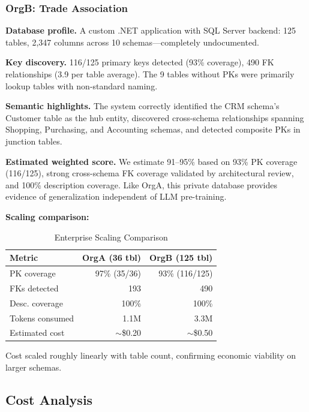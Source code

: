 \documentclass[twocolumn]{svjour3}
\begin{document}
\subsubsection{OrgB: Trade Association}

\textbf{Database profile.} A custom .NET application with SQL Server backend: 125 tables, 2{,}347 columns across 10 schemas---completely undocumented.

\textbf{Key discovery.} 116/125 primary keys detected (93\% coverage), 490 FK relationships (3.9 per table average). The 9 tables without PKs were primarily lookup tables with non-standard naming.

\textbf{Semantic highlights.} The system correctly identified the CRM schema's Customer table as the hub entity, discovered cross-schema relationships spanning Shopping, Purchasing, and Accounting schemas, and detected composite PKs in junction tables.

\textbf{Estimated weighted score.} We estimate 91--95\% based on 93\% PK coverage (116/125), strong cross-schema FK coverage validated by architectural review, and 100\% description coverage. Like OrgA, this private database provides evidence of generalization independent of LLM pre-training.

\textbf{Scaling comparison:}

\begin{table}[htbp]
\caption{Enterprise Scaling Comparison}
\label{tab:enterprise}
\centering
\begin{tabular}{lrr}
\toprule
\textbf{Metric} & \textbf{OrgA (36 tbl)} & \textbf{OrgB (125 tbl)} \\
\midrule
PK coverage & 97\% (35/36) & 93\% (116/125) \\
FKs detected & 193 & 490 \\
Desc. coverage & 100\% & 100\% \\
Tokens consumed & 1.1M & 3.3M \\
Estimated cost & $\sim$\$0.20 & $\sim$\$0.50 \\
\bottomrule
\end{tabular}
\end{table}

Cost scaled roughly linearly with table count, confirming economic viability on larger schemas.

\subsection{Cost Analysis}
\end{document}
